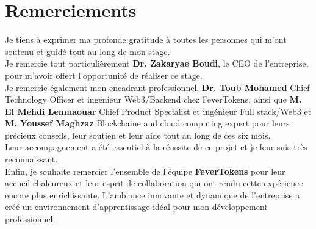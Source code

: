 \chapter*{Remerciements}
Je tiens à exprimer ma profonde gratitude à toutes les personnes qui m'ont soutenu et guidé tout au long de mon stage.\\[3mm] 
Je remercie tout particulièrement \textbf{Dr. Zakaryae Boudi}, le CEO de l'entreprise, pour m'avoir offert l'opportunité de réaliser ce stage.\\[1mm]
Je remercie également mon encadrant professionnel, \textbf{Dr. Toub Mohamed} Chief Technology Officer et ingénieur Web3/Backend chez FeverTokens, ainsi que \textbf{M. El Mehdi Lemnaouar} Chief Product Specialist et ingénieur Full stack/Web3 et \textbf{M. Youssef Maghzaz} Blockchaine and cloud computing expert pour leurs précieux conseils, leur soutien et leur aide tout au long de ces six mois.\\[1mm]
Leur accompagnement a été essentiel à la réussite de ce projet et je leur suis très reconnaissant.\\[3mm]
Enfin, je souhaite remercier l'ensemble de l'équipe \textbf{\textcolor{ftRed}{FeverTokens}} pour leur accueil chaleureux et leur esprit de collaboration qui ont rendu cette expérience encore plus enrichissante. L'ambiance innovante et dynamique de l'entreprise a créé un environnement d'apprentissage idéal pour mon développement professionnel. 

\clearpage
